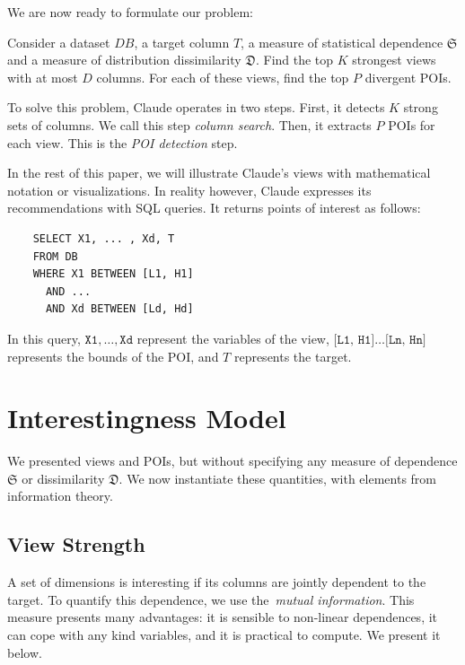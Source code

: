 We are now ready to formulate our problem:
\begin{problem}
Consider a dataset $DB$, a target column $T$, a measure of statistical
dependence $\mathfrak{S}$ and a measure of distribution dissimilarity
$\mathfrak{D}$. Find the top $K$ strongest views with at most $D$ columns. For
each of these views, find the top $P$ divergent POIs.
\end{problem}
To solve this problem, Claude operates in two steps. First, it detects $K$
strong sets of columns.  We call this step \emph{column search}.  Then, it
extracts $P$ POIs for each view. This is the \emph{POI detection} step.

In the rest of this paper, we will illustrate Claude's views with mathematical
notation or visualizations. In reality however, Claude expresses its
recommendations with SQL queries. It returns points of interest as follows:
\begin{verbatim}
    SELECT X1, ... , Xd, T
    FROM DB
    WHERE X1 BETWEEN [L1, H1]
      AND ... 
      AND Xd BETWEEN [Ld, Hd]
\end{verbatim}
In this query, $\texttt{X1},\ldots, \texttt{Xd}$ represent the variables of the
view, $\texttt{[L1, H1]}\ldots\texttt{[Ln, Hn]}$ represents the bounds of the
POI, and $T$ represents the target.




\section{Interestingness Model}
\label{sec:formalization}
We presented views and POIs, but without specifying any measure of dependence
$\mathfrak{S}$ or dissimilarity $\mathfrak{D}$. We now instantiate these
quantities, with elements from information theory.

\subsection{View Strength}
\label{sec:view-strength}
A set of dimensions is interesting if its columns are jointly dependent to the
target. To quantify this dependence, we use the~\emph{mutual information}. This
measure presents many advantages: it is sensible to non-linear dependences, it
can cope with any kind variables, and it is practical to compute. We present it
below.

